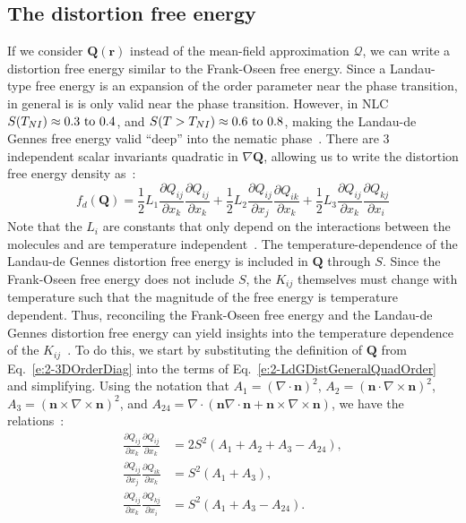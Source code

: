 \subsection{The distortion free energy}
If we consider $\mathbf{Q}(\mathbf{r})$ instead of the mean-field approximation $\bm{\mathcal{Q}}$, we can write a distortion free energy similar to the Frank-Oseen free energy.
Since a Landau-type free energy is an expansion of the order parameter near the phase transition, in general is is only valid near the phase transition.
However, in NLC $S(T_{NI}) \approx 0.3 \textup{ to } 0.4$, and $S(T > T_{NI}) \approx 0.6 \textup{ to } 0.8$, making the Landau-de Gennes free energy valid ``deep'' into the nematic phase~\cite{RN198}.
There are 3 independent scalar invariants quadratic in $\nabla\mathbf{Q}$, allowing us to write the distortion free energy density as~\cite{RN189,RN198}:
\begin{equation}
  f_d(\mathbf{Q}) = \frac{1}{2} L_1 \frac{\partial Q_{ij}}{\partial x_k} \frac{\partial Q_{ij}}{\partial x_k}
    + \frac{1}{2} L_2 \frac{\partial Q_{ij}}{\partial x_j} \frac{\partial Q_{ik}}{\partial x_k}
    + \frac{1}{2} L_3 \frac{\partial Q_{ij}}{\partial x_k} \frac{\partial Q_{kj}}{\partial x_i}\label{e:2-LdGDistGeneralQuadOrder}
\end{equation}
Note that the $L_i$ are constants that only depend on the interactions between the molecules and are temperature independent~\cite{RN198}.
The temperature-dependence of the Landau-de Gennes distortion free energy is included in $\mathbf{Q}$ through $S$.
Since the Frank-Oseen free energy does not include $S$, the $K_{ij}$ themselves must change with temperature such that the magnitude  of the free energy is temperature dependent.
Thus, reconciling the Frank-Oseen free energy and the Landau-de Gennes distortion free energy can yield insights into the temperature dependence of the $K_{ij}$~\cite{RN189,RN198}.
To do this, we start by substituting the definition of $\mathbf{Q}$ from Eq.~\ref{e:2-3DOrderDiag} into the terms of Eq.~\ref{e:2-LdGDistGeneralQuadOrder} and simplifying. Using the notation that
    $A_1 = (\nabla \cdot \mathbf{n})^2$,
    $A_2 = (\mathbf{n} \cdot \nabla \times \mathbf{n})^2$,
    $A_3 = (\mathbf{n} \times \nabla \times \mathbf{n})^2$, and
    $A_{24} = \nabla \cdot (\mathbf{n} \nabla \cdot \mathbf{n} + \mathbf{n} \times \nabla \times \mathbf{n})$, we have the relations~\cite{RN189,RN198}:
\begin{align}
  \frac{\partial Q_{ij}}{\partial x_k} \frac{\partial Q_{ij}}{\partial x_k} & =
    2 S^2(A_1 + A_2 + A_3 -A_{24}),\label{e:2-LdGRelationsQuadOrderA} \\
  \frac{\partial Q_{ij}}{\partial x_j} \frac{\partial Q_{ik}}{\partial x_k} &=
    S^2 (A_1 + A_3),\label{e:2-LdGRelationsQuadOrderB}\\
  \frac{\partial Q_{ij}}{\partial x_k} \frac{\partial Q_{kj}}{\partial x_i} &=
    S^2 (A_1 + A_3 - A_{24}).\label{e:2-LdGRelationsQuadOrderC}
\end{align}

